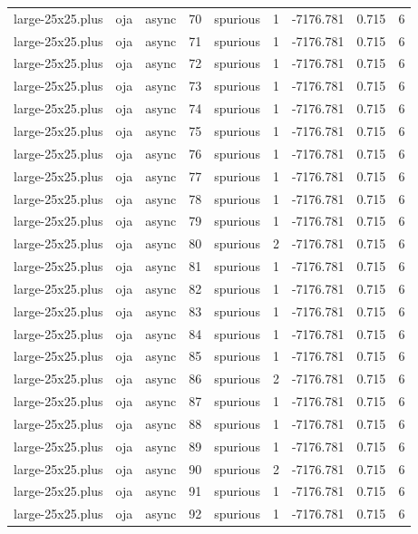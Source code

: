 \begin{tabular}{lllrlrrrr}
large-25x25.plus & oja & async & 70 & spurious & 1 & -7176.781 & 0.715 & 6 \\
large-25x25.plus & oja & async & 71 & spurious & 1 & -7176.781 & 0.715 & 6 \\
large-25x25.plus & oja & async & 72 & spurious & 1 & -7176.781 & 0.715 & 6 \\
large-25x25.plus & oja & async & 73 & spurious & 1 & -7176.781 & 0.715 & 6 \\
large-25x25.plus & oja & async & 74 & spurious & 1 & -7176.781 & 0.715 & 6 \\
large-25x25.plus & oja & async & 75 & spurious & 1 & -7176.781 & 0.715 & 6 \\
large-25x25.plus & oja & async & 76 & spurious & 1 & -7176.781 & 0.715 & 6 \\
large-25x25.plus & oja & async & 77 & spurious & 1 & -7176.781 & 0.715 & 6 \\
large-25x25.plus & oja & async & 78 & spurious & 1 & -7176.781 & 0.715 & 6 \\
large-25x25.plus & oja & async & 79 & spurious & 1 & -7176.781 & 0.715 & 6 \\
large-25x25.plus & oja & async & 80 & spurious & 2 & -7176.781 & 0.715 & 6 \\
large-25x25.plus & oja & async & 81 & spurious & 1 & -7176.781 & 0.715 & 6 \\
large-25x25.plus & oja & async & 82 & spurious & 1 & -7176.781 & 0.715 & 6 \\
large-25x25.plus & oja & async & 83 & spurious & 1 & -7176.781 & 0.715 & 6 \\
large-25x25.plus & oja & async & 84 & spurious & 1 & -7176.781 & 0.715 & 6 \\
large-25x25.plus & oja & async & 85 & spurious & 1 & -7176.781 & 0.715 & 6 \\
large-25x25.plus & oja & async & 86 & spurious & 2 & -7176.781 & 0.715 & 6 \\
large-25x25.plus & oja & async & 87 & spurious & 1 & -7176.781 & 0.715 & 6 \\
large-25x25.plus & oja & async & 88 & spurious & 1 & -7176.781 & 0.715 & 6 \\
large-25x25.plus & oja & async & 89 & spurious & 1 & -7176.781 & 0.715 & 6 \\
large-25x25.plus & oja & async & 90 & spurious & 2 & -7176.781 & 0.715 & 6 \\
large-25x25.plus & oja & async & 91 & spurious & 1 & -7176.781 & 0.715 & 6 \\
large-25x25.plus & oja & async & 92 & spurious & 1 & -7176.781 & 0.715 & 6 \\

\end{tabular}
